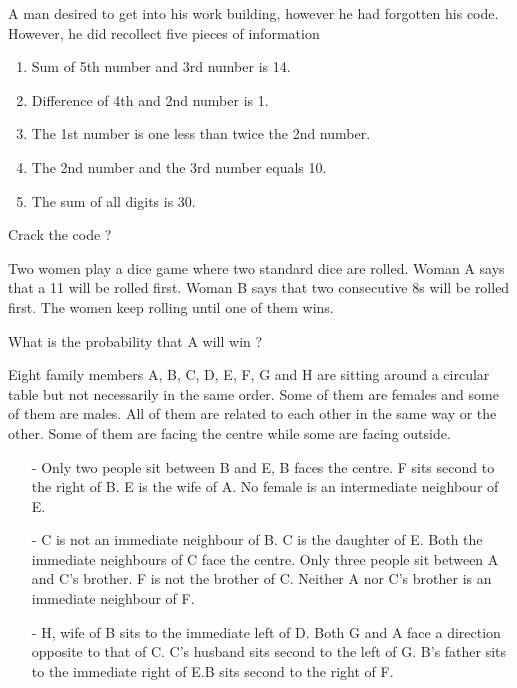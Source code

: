 \documentclass[12pt]{exam}
\begin{document}
\begin{questions}
\question[5]
A man desired to get into his work building, however he had forgotten his code. 
However, he did recollect five pieces of information
\begin{enumerate}
\item Sum of 5th number and 3rd number is 14.
\item Difference of 4th and 2nd number is 1.
\item The 1st number is one less than twice the 2nd number.
\item The 2nd number and the 3rd number equals 10.
\item The sum of all digits is 30.
\end{enumerate}

Crack the code ?\hfill \fbox{
	\begin{minipage}{1.5cm}
		\hfill\vspace{3mm}
	\end{minipage}
	}

\addpoints

\question[4]
Two women play a dice game where two standard dice are rolled. Woman A says that a 11 will be rolled first. Woman B says that two consecutive 8s will be rolled first. The women keep rolling until one of them wins.


What is the probability that A will win ?
\hfill \fbox{
	\begin{minipage}{1cm}
		\hfill\vspace{3mm}
	\end{minipage}
	} 
\addpoints

\question[5]
Eight family members A, B, C, D, E, F, G and H are sitting around a circular table but not necessarily in the same order. Some of them are females and some of them are males. All of them are related to each other in the same way or the other. Some of them are facing the centre while some are facing outside.
\begin{enumerate}

\item[-] Only two people sit between B and E, B faces the centre. F sits second to the right of B. E is the wife of A. No female is an intermediate neighbour of E.
\item[-] C is not an immediate neighbour of B. C is the daughter of E. Both the immediate neighbours of C face the centre. Only three people sit between A and C’s brother. F is not the brother of C. Neither A nor C’s brother is an immediate neighbour of F.
\item[-] H, wife of B sits to the immediate left of D. Both G and A face a direction opposite to that of C. C’s husband sits second to the left of G. B’s father sits to the immediate right of E.B sits second to the right of F.



\end{enumerate}
\end{questions}
\end{document}
